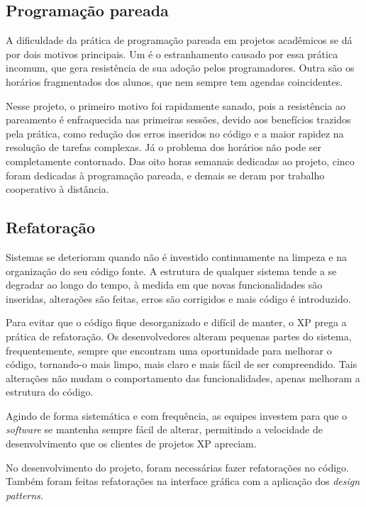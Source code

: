   \subsection{Programação pareada}
    A dificuldade da prática de programação pareada em projetos acadêmicos se dá por dois motivos principais. Um é o estranhamento causado por essa prática incomum, que gera resistência de sua adoção pelos programadores. Outra são os horários fragmentados dos alunos, que nem sempre tem agendas coincidentes.

    Nesse projeto, o primeiro motivo foi rapidamente sanado, pois a resistência ao pareamento é enfraquecida nas primeiras sessões, devido aos benefícios trazidos pela prática, como redução dos erros inseridos no código e a maior rapidez na resolução de tarefas complexas. Já o problema dos horários não pode ser completamente contornado. Das oito horas semanais dedicadas ao projeto, cinco foram dedicadas à programação pareada, e demais se deram por trabalho cooperativo à distância.

  \subsection{Refatoração}

Sistemas se deterioram quando não é investido continuamente na limpeza e na organização do seu código fonte. A estrutura de qualquer sistema tende a se degradar ao longo do tempo, à medida em que novas funcionalidades são inseridas, alterações são feitas, erros são corrigidos e mais código é introduzido. 

Para evitar que o código fique desorganizado e difícil de manter, o XP prega a prática de refatoração. Os desenvolvedores alteram pequenas partes do sistema, frequentemente, sempre que encontram uma oportunidade para melhorar o código, tornando-o mais limpo, mais claro e mais fácil de ser compreendido. Tais alterações não mudam o comportamento das funcionalidades, apenas melhoram a estrutura do código. 

Agindo de forma sistemática e com frequência, as equipes investem para que o \textit{software} se mantenha sempre fácil de alterar, permitindo a velocidade de desenvolvimento que os clientes de projetos XP apreciam.

No desenvolvimento do projeto, foram necessárias fazer refatorações no código. Também foram feitas refatorações na interface gráfica com a aplicação dos \textit{design patterns}.

